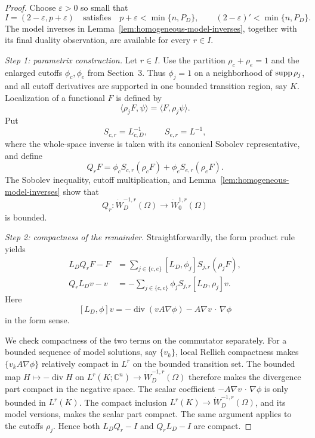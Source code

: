 \documentclass[12pt]{amsart}
\newcommand{\cdo}{\, \cdot \,}
\newcommand{\supp}{{\rm supp}{\hspace{.05cm}}}
\newcommand{\diver}{\operatorname{div}}
\theoremstyle{remark}
\begin{document}
\begin{proof}
Choose \(\varepsilon>0\) so small that
\[
 I=(2-\varepsilon,p+\varepsilon)
 \quad\text{satisfies}\quad
 p+\varepsilon<\min\{n,P_D\},
 \qquad (2-\varepsilon)'<\min\{n,P_D\}.
\]
The model inverses in Lemma~\ref{lem:homogeneous-model-inverses}, together
with its final duality observation, are available for every \(r\in I\).

\emph{Step 1: parametrix construction.}
Let $r\in I$. Use the partition \(\rho_c+\rho_e=1\) and the enlarged cutoffs
\(\phi_c,\phi_e\) from Section~3.  Thus \(\phi_j=1\) on a neighborhood of
\(\supp\rho_j\), and all cutoff derivatives are supported in one bounded
transition region, say $K$.  Localization of a functional $F$ is defined by
\[
 \langle\rho_jF,\psi\rangle=\langle F,\rho_j\psi\rangle.
\]
Put
\[
 S_{c,r}=L_{c,D}^{-1},\qquad S_{e,r}=L^{-1},
\]
where the whole-space inverse is taken with its canonical Sobolev
representative, and define
\[
 Q_rF=\phi_cS_{c,r}(\rho_cF)+\phi_eS_{e,r}(\rho_eF).
\]
The Sobolev inequality, cutoff multiplication, and
Lemma~\ref{lem:homogeneous-model-inverses} show that
\[
 Q_r:\dot W^{-1,r}_D(\Omega)\longrightarrow\dot W^{1,r}_0(\Omega)
\]
is bounded.

\emph{Step 2: compactness of the remainder.}
Straightforwardly, the form product rule yields
\begin{align*}
 L_DQ_rF-F
 &=\sum_{j\in\{c,e\}}[L_D,\phi_j]S_{j,r}(\rho_jF),\\
 Q_rL_Dv-v
 &=-\sum_{j\in\{c,e\}}\phi_jS_{j,r}[L_D,\rho_j]v.
\end{align*}
Here
\[
 [L_D,\phi]v
 =-\diver(vA\nabla\phi)-A\nabla v\mathbin{\cdo}\nabla\phi
\]
in the form sense.

We check compactness of the two terms on the commutator separately.  For a bounded sequence of model solutions, say $\{v_k\}$, local Rellich compactness makes \(\{v_k A\nabla\phi\}\) relatively compact in \(L^r\) on the bounded transition set. The bounded map
\(H\mapsto-\diver H\) on $L^r(K;\mathbb C^n) \to \dot W^{-1,r}_D(\Omega)$ therefore makes the divergence part compact in the negative space.  The scalar coefficient
\(-A\nabla v\mathbin{\cdo}\nabla\phi\) is only bounded in \(L^r(K)\).
The compact inclusion \(L^r(K)\to\dot W^{-1,r}_D(\Omega)\), and its model
versions, makes the scalar part compact.  The same argument applies to
the cutoffs \(\rho_j\).  Hence both \(L_DQ_r-I\) and \(Q_rL_D-I\) are
compact.


\end{proof}
\end{document}
